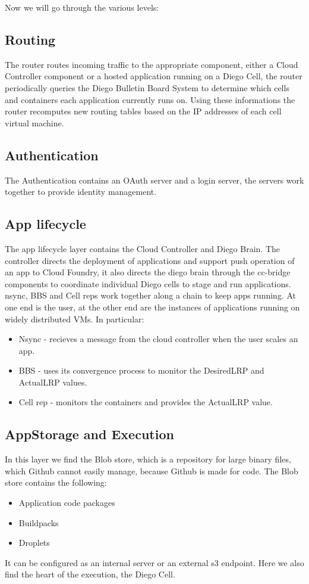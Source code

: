 Now we will go through the various levels:
\subsection{Routing}
The router routes incoming traffic to the appropriate component, either a Cloud Controller component or a hosted application running on a Diego Cell, the router periodically queries the Diego Bulletin Board System to determine which cells and containers each application currently runs on. Using these informations the router recomputes new routing tables based on the IP addresses of each cell virtual machine.
\subsection{Authentication}
The Authentication contains an OAuth server and a login server, the servers work together to provide identity management.
\subsection{App lifecycle}
The app lifecycle layer contains the Cloud Controller and Diego Brain. The controller directs the deployment of applications and support push operation of an app to Cloud Foundry, it also directs the diego brain through the cc-bridge components to coordinate individual Diego cells to stage and run applications. \n
nsync, BBS and Cell reps work together along a chain to keep apps running. At one end is the user, at the other end are the instances of applications running on widely distributed VMs. In particular:
\begin{itemize}
    \item Nsync - recieves a message from the cloud controller when the user scales an app.
    \item BBS - uses its convergence process to monitor the DesiredLRP and ActualLRP values.
    \item Cell rep - monitors the containers and provides the ActualLRP value.
\end{itemize}
\subsection{AppStorage and Execution}
In this layer we find the Blob store, which is a repository for large binary files, which Github cannot easily manage, because Github is made for code. The Blob store contains the following:
\begin{itemize}
    \item Application code packages
    \item Buildpacks
    \item Droplets
\end{itemize}
It can be configured as an internal server or an external s3 endpoint. \n
Here we also find the heart of the execution, the Diego Cell.
